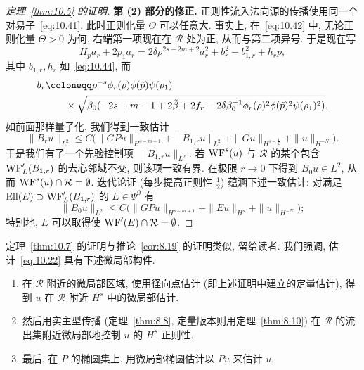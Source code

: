 \begin{proof}[定理~\ref{thm:10.5} 的证明]
\medskip\noindent\textbf{第 (2) 部分的修正.} 正则性流入法向源的传播使用同一个对易子~\eqref{eq:10.41}. 此时正则化量 $\Theta$ 可以任意大. 事实上, 在~\eqref{eq:10.42} 中, 无论正则化量 $\Theta > 0$ 为何, 右端第一项现在在 $\mathcal{R}$ 处为正, 从而与第二项异号. 于是现在写
\begin{equation}\label{eq:10.52}
    H_p a_r + 2p_1 a_r = 2\delta\rho^{2s-2m+2}a_r^2 + b_r^2 - b_{1,r}^2 + h_r p,
\end{equation}
其中 $b_{1,r}, h_r$ 如~\eqref{eq:10.44}, 而
\begin{equation}\label{eq:10.53}
    \begin{aligned}
        b_r &\defeq \rho^{-s}\phi_r(\rho)\phi(\tilde{p})\psi(\rho_1) \\
        &\qquad \times \sqrt{\beta_0(-2s + m - 1 + 2\tilde{\beta} + 2f_r - 2\delta\beta_0^{-1}\phi_r(\rho)^2\phi(\tilde{p})^2\psi(\rho_1)^2)}.
    \end{aligned}
\end{equation}
如前面那样量子化, 我们得到一致估计
\begin{equation}\label{eq:10.54}
    \|B_r u\|_{L^2} \le C\bigl(\|G P u\|_{H^{s-m+1}} + \|B_{1,r}u\|_{L^2} + \|G u\|_{H^{s-\frac{1}{2}}} + \|u\|_{H^{-N}}\bigr).
\end{equation}
于是我们有了一个先验控制项 $\|B_{1,r}u\|_{L^2}$: 若 $\operatorname{WF}^s(u)$ 与 $\mathcal{R}$ 的某个包含 $\operatorname{WF}_L'(B_{1,r})$ 的去心邻域不交, 则该项一致有界. 在极限 $r \to 0$ 下得到 $B_0 u \in L^2$, 从而 $\operatorname{WF}^s(u) \cap \mathcal{R} = \emptyset$. 迭代论证 (每步提高正则性 $\frac{1}{2}$) 蕴涵下述一致估计: 对满足 $\operatorname{Ell}(E) \supset \operatorname{WF}_L'(B_{1,r})$ 的 $E \in \Psi^0$ 有
\begin{equation}\label{eq:10.55}
    \|B_0 u\|_{L^2} \le C\bigl(\|G P u\|_{H^{s-m+1}} + \|E u\|_{H^s} + \|u\|_{H^{-N}}\bigr);
\end{equation}
特别地, $E$ 可以取得使 $\operatorname{WF}'(E) \cap \mathcal{R} = \emptyset$.
\end{proof}

定理~\ref{thm:10.7} 的证明与推论~\ref{cor:8.19} 的证明类似, 留给读者. 我们强调, 估计~\eqref{eq:10.22} 具有下述微局部构件.

\begin{enumerate}
    \item 在 $\mathcal{R}$ 附近的微局部区域, 使用径向点估计 (即上述证明中建立的定量估计), 得到 $u$ 在 $\mathcal{R}$ 附近 $H^s$ 中的微局部估计.
    \item 然后用实主型传播 (定理~\ref{thm:8.8}, 定量版本则用定理~\ref{thm:8.10}) 在 $\mathcal{R}$ 的流出集附近微局部地控制 $u$ 的 $H^s$ 正则性.
    \item 最后, 在 $P$ 的椭圆集上, 用微局部椭圆估计以 $P u$ 来估计 $u$.
\end{enumerate}

